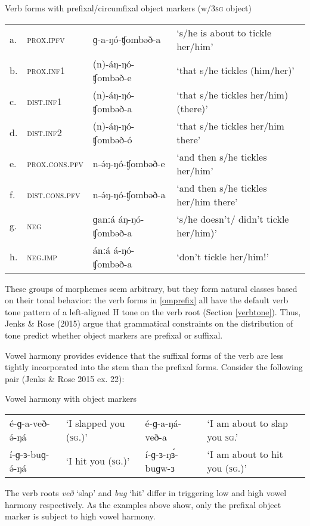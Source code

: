 \ea Verb forms with prefixal/circumfixal object markers (w/3\textsc{sg} object)\label{omprefix}\\
\begin{tabular}[t]{llll}
a.&	\textsc{prox.ipfv}   &	ɡ-a-ŋó-ʧombəð-a &	‘s/he is about to tickle her/him’\\
b.&	\textsc{prox.inf1} 	& (n)-áŋ-ŋó-ʧombəð-e	& ‘that s/he tickles (him/her)’\\
c.&	\textsc{dist.inf1} 	& (n)-áŋ-ŋó-ʧombəð-a &	‘that s/he tickles her/him) (there)’\\
d.&	\textsc{dist.inf2}  & (n)-áŋ-ŋó-ʧombəð-ó & ‘that s/he tickles her/him there’ \\
e.&	\textsc{prox.cons.pfv} & n-ə́ŋ-ŋó-ʧombəð-e & 	‘and then s/he tickles her/him’\\
f.&	\textsc{dist.cons.pfv} & n-ə́ŋ-ŋó-ʧombəð-a	& ‘and then s/he tickles her/him there’\\
g.&	\textsc{neg} & ɡanːá áŋ-ŋó-ʧombəð-a &‘s/he doesn’t/ didn’t tickle her/him)’\\
h.&	\textsc{neg.imp} & ánːá á-ŋó-ʧombəð-a& ‘don’t tickle her/him!’	\\
				\end{tabular}
\z 

These groups of morphemes seem arbitrary, but they form natural classes based on their tonal behavior: the verb forms in \ref{omprefix} all have the default verb tone pattern of a left-aligned H tone on the verb root (Section \ref{verbtone}). Thus, Jenks \& Rose (2015) argue that grammatical constraints on the distribution of tone predict whether object markers are prefixal or suffixal. %

Vowel harmony provides evidence that the suffixal forms of the verb are less tightly incorporated into the stem than the prefixal forms. Consider the following pair (Jenks \& Rose 2015 ex. 22):

\ea Vowel harmony with object markers
\begin{tabular}[t]{llll}
	é-ɡ-a-veð-ə́-ŋá	& ‘I slapped you (\textsc{sg}.)’ & é-ɡ-a-ŋá-veð-a  &	‘I am about to slap you \textsc{sg}.’\\
	í-ɡ-ɜ-buɡ-ə́-ŋá 	 &	‘I hit you (\textsc{sg}.)’		 & í-ɡ-ɜ-ŋɜ́-buɡw-ɜ	& ‘I am about to hit you (\textsc{sg}.)’ \\
	\end{tabular}
\z

The verb roots \textit{veð} `slap' and \textit{bug} `hit' differ in triggering low and high vowel harmony respectively. As the examples above show, only the prefixal object marker is subject to high vowel harmony.

